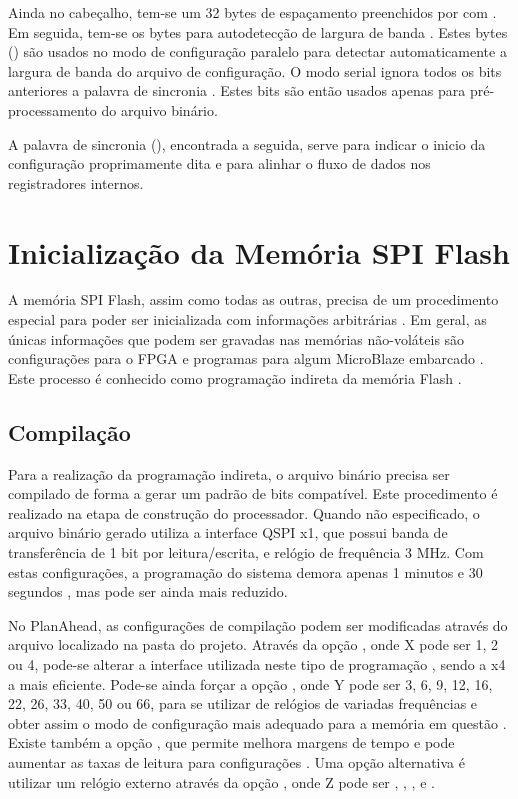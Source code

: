 \documentclass[11pt,a4paper,oneside]{book}
\begin{document}
Ainda no cabeçalho, tem-se um 32 bytes de espaçamento preenchidos por com .
Em seguida, tem-se os bytes para autodetecção de largura de banda \cite{ug470, xapp583}.
Estes bytes () são usados no modo de configuração paralelo para detectar automaticamente a largura de banda do arquivo de configuração.
O modo serial ignora todos os bits anteriores a palavra de sincronia \cite{xapp583}.
Estes bits são então usados apenas para pré-processamento do arquivo binário.

A palavra de sincronia (), encontrada a seguida, serve para indicar o inicio da configuração proprimamente dita e para alinhar o fluxo de dados nos registradores internos.

\section{Inicialização da Memória SPI Flash}
\label{sec:flash_indireta}
A memória SPI Flash, assim como todas as outras, precisa de um procedimento especial para poder ser inicializada com informações arbitrárias \cite{xapp694}.
Em geral, as únicas informações que podem ser gravadas nas memórias não-voláteis são configurações para o FPGA e programas para algum MicroBlaze embarcado \cite{ug111}.
Este processo é conhecido como programação indireta da memória Flash \cite{xapp586}.

\subsection{Compilação} Para a realização da programação indireta, o arquivo binário precisa ser compilado de forma a gerar um padrão de bits compatível.
Este procedimento é realizado na etapa de construção do processador.
Quando não especificado, o arquivo binário gerado utiliza a interface QSPI x1, que possui banda de transferência de 1 bit por leitura/escrita,  e relógio de frequência 3 MHz.
Com estas configurações, a programação do sistema demora apenas 1 minutos e 30 segundos \cite{xapp586}, mas pode ser ainda mais reduzido.

No PlanAhead, as configurações de compilação podem ser modificadas através do arquivo  localizado na pasta  do projeto.
Através da opção , onde X pode ser 1, 2 ou 4, pode-se alterar a interface utilizada neste tipo de programação \cite{ug628, xapp576}, sendo a x4 a mais eficiente.
Pode-se ainda forçar a opção , onde Y pode ser 3, 6, 9, 12, 16, 22, 26, 33, 40, 50 ou 66, para se utilizar de relógios de variadas frequências e obter assim o modo de configuração mais adequado para a memória em questão \cite{xapp586, ug628, ug810}.
Existe também a opção , que permite melhora margens de tempo e pode aumentar as taxas de leitura para configurações \cite{ug628, ug586}.
Uma opção alternativa é utilizar um relógio externo através da opção , onde Z pode ser , , ,  e .
\end{document}
